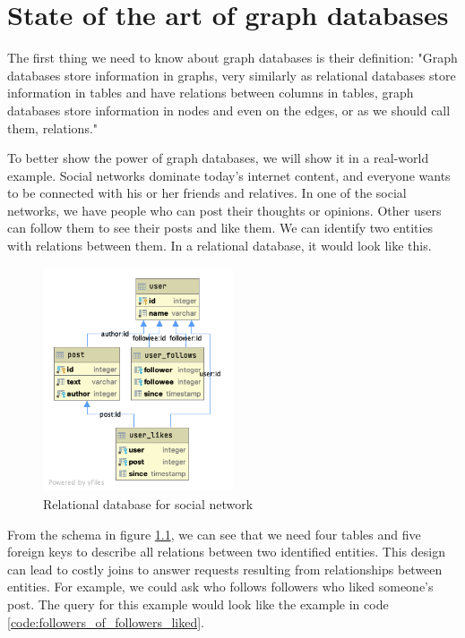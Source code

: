 \chapter {State of the art of graph databases}

The first thing we need to know about graph databases is their definition:
"Graph databases store information in graphs, very similarly as relational databases store information in tables and have relations between columns in tables, graph databases store information in nodes and even on the edges, or as we should call them, relations." \cite{morgante_what_2021}

To better show the power of graph databases, we will show it in a real-world example.
Social networks dominate today's internet content, and everyone wants to be connected with his or her friends and relatives.
In one of the social networks, we have people who can post their thoughts or opinions.
Other users can follow them to see their posts and like them.
We can identify two entities with relations between them.
In a relational database, it would look like this.

\begin{figure}[H]
	\centering
	\includegraphics[width=0.5\textwidth]{content/thesis-db.png}
	\caption{Relational database for social network}
	\label{fig:relscheme}
\end{figure}

From the schema in figure \ref{fig:relscheme}, we can see that we need four tables and five foreign keys to describe all relations between two identified entities.
This design can lead to costly joins to answer requests resulting from relationships between entities.
For example, we could ask who follows followers who liked someone's post.
The query for this example would look like the example in code \ref{code:followers_of_followers_liked}.

